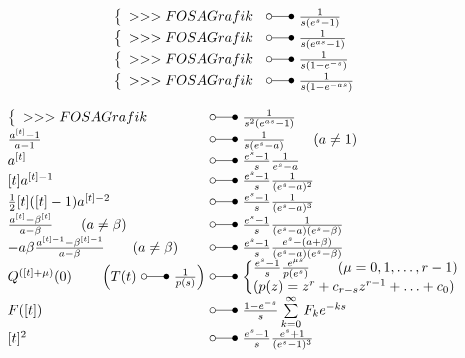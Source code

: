 \[\begin{array}{@{}l@{ ~ \laplace ~ }l@{}}
\left\lbrace\begin{array}{l}
>>>FOSA Grafik \\
\end{array}\right. &
    \frac{1}{s (e^s - 1)} \\
\left\lbrace\begin{array}{l}
>>>FOSA Grafik \\
\end{array}\right. &
    \frac{1}{s (e^{as} - 1)} \\
\left\lbrace\begin{array}{l}
>>>FOSA Grafik \\
\end{array}\right. &
    \frac{1}{s (1 - e^{-s})} \\
\left\lbrace\begin{array}{l}
>>>FOSA Grafik \\
\end{array}\right. &
    \frac{1}{s (1 - e^{-as})} \\
\end{array} \]

\[ \begin{array}{@{}l@{ ~ \laplace ~ }l@{}}
\left\lbrace\begin{array}{l}
>>>FOSA Grafik \\
\end{array}\right. &
    \frac{1}{s^2 (e^{as} - 1)} \\
\frac{a^{[t]} - 1}{a - 1} &
    \frac{1}{s (e^s - a)} \qquad (a \neq 1) \\
a^{[t]} &
    \frac{e^s - 1}{s} \frac{1}{e^s - a} \\
\lbrack t \rbrack a^{[t] - 1} &
    \frac{e^s - 1}{s} \frac{1}{(e^s - a)^2} \\
\frac{1}{2} [t] ([t] - 1) a^{[t] - 2} &
    \frac{e^s - 1}{s} \frac{1}{(e^s - a)^3} \\
\frac{a^{[t]} - \beta^{[t]}}{a - \beta} \qquad (a \neq \beta) &
    \frac{e^s - 1}{s} \frac{1}{(e^s - a) (e^s - \beta)} \\
- a \beta \frac{a^{[t] - 1} - \beta^{[t] - 1}}{a - \beta} \qquad (a \neq \beta) &
    \frac{e^s - 1}{s} \frac{e^s - (a + \beta)}{(e^s - a) (e^s - \beta)} \\
Q^{([t] + \mu)} (0) \qquad \left(T(t) ~ \laplace ~ \frac{1}{p(s)}\right) &
    \left\lbrace\begin{array}{@{}l@{}}
    \frac{e^s - 1}{s} \frac{e^{\mu s}}{p(e^s)} \qquad (\mu = 0, 1, \ldots, r - 1) \\
    (p(z) = z^r + c_{r - s} z^{r - 1} + \ldots + c_0) \\
    \end{array}\right. \\
F([t]) &
    \frac{1 - e^{-s}}{s} \sum\limits_{k=0}^{\infty} F_k e^{-ks} \\
{[t]^2} &
    \frac{e^s - 1}{s} \frac{e^s + 1}{(e^s - 1)^3} \\

\end{array} \]

